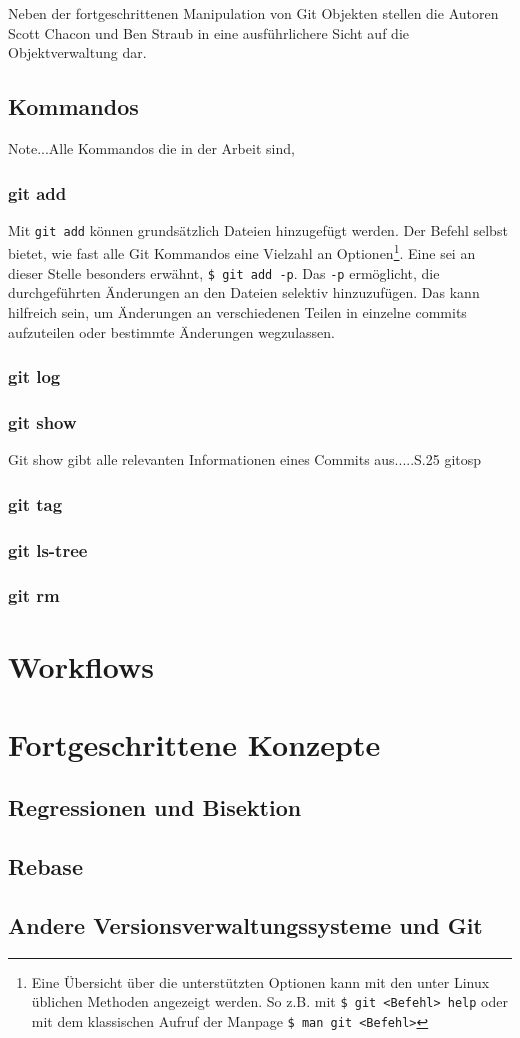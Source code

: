 Neben der fortgeschrittenen Manipulation von Git Objekten stellen die Autoren
Scott Chacon und Ben Straub in \cite[S.~408-418]{progit} eine ausführlichere
Sicht auf die Objektverwaltung dar.

\subsection{Kommandos}\label{sec:commands}
Note...Alle Kommandos die in der Arbeit sind,

\subsubsection{git add}\label{sec:gitadd}
Mit \texttt{git add} können grundsätzlich Dateien hinzugefügt werden. Der
Befehl selbst bietet, wie fast alle Git Kommandos eine Vielzahl an
Optionen\footnote{Eine Übersicht über die unterstützten Optionen kann mit den
unter Linux üblichen Methoden angezeigt werden. So z.B. mit \texttt{\$ git <Befehl>
help} oder mit dem klassischen Aufruf der Manpage \texttt{\$ man git <Befehl>}}.
Eine sei an dieser Stelle besonders erwähnt, \texttt{\$ git add -p}. Das
\texttt{-p} ermöglicht, die durchgeführten Änderungen an den Dateien selektiv
hinzuzufügen. Das kann hilfreich sein, um Änderungen an verschiedenen Teilen in
einzelne \glspl{commit} aufzuteilen oder bestimmte Änderungen wegzulassen.

\subsubsection{git log}\label{sec:gitlog}
\subsubsection{git show}\label{sec:gitshow}
Git show gibt alle relevanten Informationen eines Commits aus.....S.25 gitosp
\subsubsection{git tag}
\subsubsection{git ls-tree}
\subsubsection{git rm}

\section{Workflows}\label{sec:Workflows}
\section{Fortgeschrittene Konzepte}
\label{sec:FortgeschritteneKonzepte}
\subsection{Regressionen und Bisektion}\label{sec:bisec}
\subsection{Rebase}\label{sec:rebase}
\subsection{Andere Versionsverwaltungssysteme und Git}
\label{sec:AndereVersionsverwaltungssystemeundGit}
